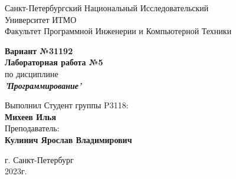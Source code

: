 \documentclass[12pt,onecolumn]{article}
\begin{document}
\begin{center}
    Санкт-Петербургский Национальный Исследовательский\\ 
    Университет ИТМО\\
    Факультет Программной Инженерии и Компьютерной Техники\\
\end{center}
\vspace{1cm}


\begin{center}
    \large \textbf{Вариант №31192}\\
    \textbf{Лабораторная работа №5}\\
    по дисциплине\\
    \textbf{\textit{'Программирование'}}
\end{center}

\vspace{3cm}
\begin{flushright}
  Выполнил Студент  группы P3118: \\
  \textbf{Михеев Илья}\\
  Преподаватель: \\
  \textbf{Кулинич Ярослав Владимирович}\\
\end{flushright}

\vspace{14cm}
\begin{center}
    г. Санкт-Петербург\\
    2023г.
\end{center}

\newpage

\tableofcontents

\vspace{1cm}
\end{document}

